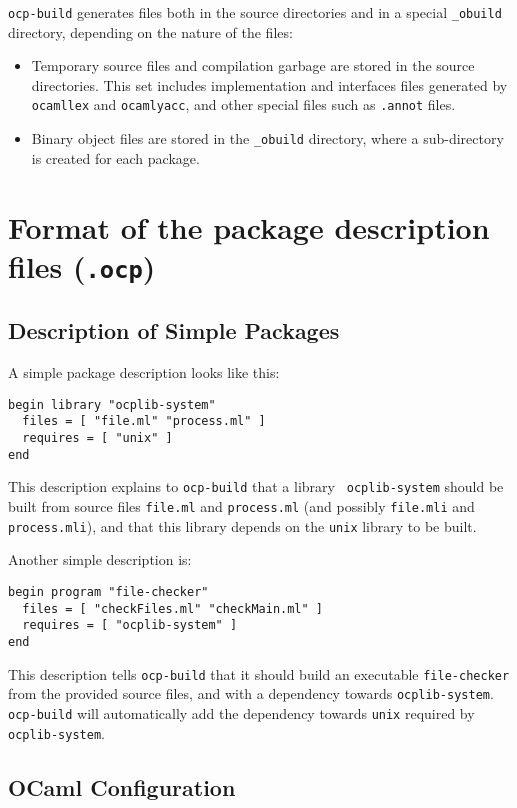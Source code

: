 {\tt ocp-build} generates files both in the source directories and in
a special {\tt \_obuild} directory, depending on the nature of the
files:
\begin{itemize}
\item Temporary source files and compilation garbage are stored in the
  source directories. This set includes implementation and interfaces
  files generated by {\tt ocamllex} and {\tt ocamlyacc}, and other
  special files such as {\tt .annot} files.
\item Binary object files are stored in the {\tt \_obuild} directory,
  where a sub-directory is created for each package.
\end{itemize}

\section{Format of the package description files ({\tt .ocp})}

\subsection{Description of Simple Packages}

A simple package description looks like this:

\begin{verbatim}
begin library "ocplib-system"
  files = [ "file.ml" "process.ml" ]
  requires = [ "unix" ]
end
\end{verbatim}

This description explains to {\tt ocp-build} that a library {\tt
  ocplib-system} should be built from source files {\tt file.ml} and
{\tt process.ml} (and possibly {\tt file.mli} and {\tt process.mli}),
and that this library depends on the {\tt unix} library to be built.

Another simple description is:

\begin{verbatim}
begin program "file-checker"
  files = [ "checkFiles.ml" "checkMain.ml" ]
  requires = [ "ocplib-system" ]
end
\end{verbatim}

This description tells {\tt ocp-build} that it should build an
executable {\tt file-checker} from the provided source files, and with
a dependency towards {\tt ocplib-system}. {\tt ocp-build} will
automatically add the dependency towards {\tt unix} required by {\tt
  ocplib-system}.

\subsection{OCaml Configuration}

